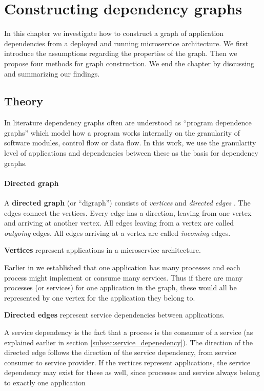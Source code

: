 
\chapter{Constructing dependency graphs}
\label{chapter:dependency_graph}

In this chapter we investigate how to construct a graph of application dependencies from a deployed and running microservice architecture. We first introduce the assumptions regarding the properties of the graph. Then we propose four methods for graph construction. We end the chapter by discussing and summarizing our findings.

\section{Theory}

In literature dependency graphs often are understood as ``program dependence graphs'' \cite{Horwitz} which model how a program works internally on the granularity of software modules, control flow or data flow. In this work, we use the granularity level of applications and dependencies between these as the basis for dependency graphs.

\subsubsection{Directed graph}

A \textbf{directed graph} (or ``digraph'') consists of \emph{vertices} and \emph{directed edges} \cite{ChartrandGary}. The edges connect the vertices. Every edge has a direction, leaving from one vertex and arriving at another vertex. All edges leaving from a vertex are called \emph{outgoing} edges. All edges arriving at a vertex are called \emph{incoming} edges.

\textbf{Vertices} represent applications in a microservice architecture.

Earlier in  we established that one application has many processes and each process might implement or consume many services. Thus if there are many processes (or services) for one application in the graph, these would all be represented by one vertex for the application they belong to.

\textbf{Directed edges} represent service dependencies between applications.

A service dependency is the fact that a process is the consumer of a service (as explained earlier in section \ref{subsec:service_depenedency}). The direction of the directed edge follows the direction of the service dependency, from service consumer to service provider. If the vertices represent applications, the service dependency may exist for these as well, since processes and service always belong to exactly one application

